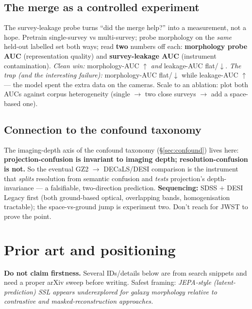 \documentclass[11pt,a4paper]{article}
\begin{document}
\subsection{The merge as a controlled experiment}

The survey-leakage probe turns ``did the merge help?'' into a measurement, not a hope. Pretrain
single-survey vs multi-survey; probe morphology on the \emph{same} held-out labelled set both
ways; read \textbf{two} numbers off each: \textbf{morphology probe AUC} (representation quality)
and \textbf{survey-leakage AUC} (instrument contamination). \emph{Clean win:} morphology-AUC
$\uparrow$ \emph{and} leakage-AUC flat/$\downarrow$. \emph{The trap (and the interesting
failure):} morphology-AUC flat/$\downarrow$ while leakage-AUC $\uparrow$ --- the model spent the
extra data on the cameras. Scale to an ablation: plot both AUCs against corpus heterogeneity
(single $\rightarrow$ two close surveys $\rightarrow$ add a space-based one).

\subsection{Connection to the confound taxonomy}

The imaging-depth axis of the confound taxonomy (\S\ref{sec:confound}) lives here:
\textbf{projection-confusion is invariant to imaging depth; resolution-confusion is not.} So the
eventual GZ2 $\rightarrow$ DECaLS/DESI comparison is the instrument that \emph{splits} resolution
from semantic confusion and \emph{tests} projection's depth-invariance --- a falsifiable,
two-direction prediction. \textbf{Sequencing:} SDSS $+$ DESI Legacy first (both ground-based
optical, overlapping bands, homogenisation tractable); the space-vs-ground jump is experiment
two. Don't reach for JWST to prove the point.

\section{Prior art and positioning}\label{sec:priorart}

\begin{openbox}
\textbf{Do not claim firstness.} Several IDs/details below are from search snippets and need a
proper arXiv sweep before writing. Safest framing: \emph{JEPA-style (latent-prediction) SSL
appears underexplored for galaxy morphology relative to contrastive and masked-reconstruction
approaches.}
\end{openbox}
\end{document}
